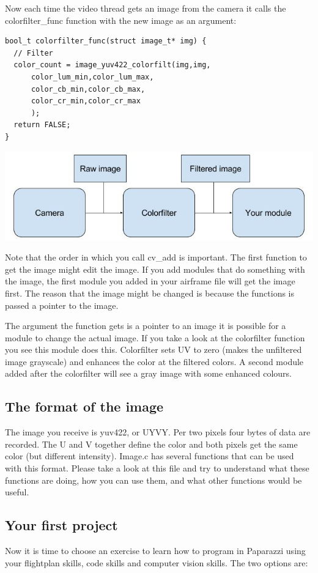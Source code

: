 \documentclass{article}
\begin{document}
Now each time the video thread gets an image from the camera it calls the colorfilter\_func function with the new image as an argument:

\begin{verbatim}
bool_t colorfilter_func(struct image_t* img) {
  // Filter
  color_count = image_yuv422_colorfilt(img,img,
      color_lum_min,color_lum_max,
      color_cb_min,color_cb_max,
      color_cr_min,color_cr_max
      );
  return FALSE;
}
\end{verbatim}
\begin{center}
\includegraphics[width=0.8\linewidth]{camerafilter}
\end{center}

Note that the order in which you call cv\_add is important. The first function to get the image might edit the image. If you add modules that do something with the image, the first module you added in your airframe file will get the image first. The reason that the image might be changed is because the functions is passed a pointer to the image. 

The argument the function gets is a pointer to an image it is possible for a module to change the actual image. If you take a look at the colorfilter function you see this module does this. Colorfilter sets UV to zero (makes the unfiltered image grayscale) and enhances the color at the filtered colors. A second module added after the colorfilter will see a gray image with some enhanced colours. 

\subsection*{The format of the image}
The image you receive is yuv422, or UYVY. Per two pixels four bytes of data are recorded. The U and V together define the color and both pixels get the same color (but different intensity). Image.c has several functions that can be used with this format. Please take a look at this file and try to understand what these functions are doing, how you can use them, and what other functions would be useful. 

\subsection*{Your first project}
Now it is time to choose an exercise to learn how to program in Paparazzi using your flightplan skills, code skills and computer vision skills. The two options are:
\end{document}
